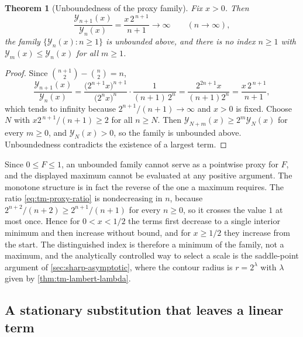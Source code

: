 \documentclass[11pt,oneside]{article}
\newtheorem{theorem}{Theorem}[section]
\theoremstyle{definition}
\theoremstyle{remark}
\begin{document}
\begin{theorem}[Unboundedness of the proxy family]
\label{thm:tm-no-max}
Fix $x>0$.  Then
\begin{equation}
 \frac{\mathcal Y_{n+1}(x)}{\mathcal Y_n(x)}=\frac{x\,2^{\,n+1}}{n+1}
 \longrightarrow\infty\qquad(n\to\infty),                  \label{eq:tm-proxy-ratio}
\end{equation}
the family $\{\mathcal Y_n(x):n\ge1\}$ is unbounded above, and there is no index $n\ge1$ with
$\mathcal Y_m(x)\le \mathcal Y_n(x)$ for all $m\ge1$.
\end{theorem}

\begin{proof}
Since $\binom{n+1}2-\binom n2=n$,
\begin{equation*}
 \frac{\mathcal Y_{n+1}(x)}{\mathcal Y_n(x)}
 =\frac{\bigl(2^{n+1}x\bigr)^{n+1}}{\bigl(2^{n}x\bigr)^{n}}
 \cdot\frac{1}{(n+1)\,2^{n}}
 =\frac{2^{2n+1}x}{(n+1)2^{n}}
 =\frac{x\,2^{\,n+1}}{n+1},
\end{equation*}
which tends to infinity because $2^{n+1}/(n+1)\to\infty$ and $x>0$ is fixed.  Choose $N$
with $x2^{\,n+1}/(n+1)\ge2$ for all $n\ge N$.  Then $\mathcal Y_{N+m}(x)\ge2^m\mathcal Y_N(x)$ for every
$m\ge0$, and $\mathcal Y_N(x)>0$, so the family is unbounded above.  Unboundedness contradicts the
existence of a largest term.
\end{proof}

Since $0\le F\le1$, an unbounded family cannot serve as a pointwise proxy for $F$, and the
displayed maximum cannot be evaluated at any positive argument.  The monotone structure is
in fact the reverse of the one a maximum requires.  The ratio \eqref{eq:tm-proxy-ratio} is
nondecreasing in $n$, because $2^{n+2}/(n+2)\ge2^{n+1}/(n+1)$ for every $n\ge0$, so it
crosses the value $1$ at most once.  Hence for $0<x<1/2$ the terms first decrease to a
single interior minimum and then increase without bound, and for $x\ge1/2$ they increase
from the start.  The distinguished index is therefore a minimum of the family, not a
maximum, and the analytically controlled way to select a scale is the saddle-point argument
of \cref{sec:sharp-asymptotic}, where the contour radius is $r=2^{\lambda}$ with $\lambda$
given by \cref{thm:tm-lambert-lambda}.

\subsection{A stationary substitution that leaves a linear term}
\label{tm:sub-stirling-defect}
\end{document}
